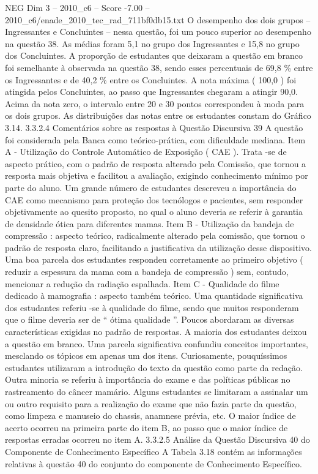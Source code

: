 \begin{textsample}{NEG Dim 3 – 2010\_c6 – Score -7.00 – 2010\_c6/enade\_2010\_tec\_rad\_711bf0db15.txt}
O desempenho dos dois grupos – Ingressantes e Concluintes – nessa questão, foi um pouco superior ao desempenho na questão 38.
As médias foram 5,1 no grupo dos Ingressantes e 15,8 no grupo dos Concluintes.
A proporção de estudantes que deixaram a questão em branco foi semelhante à observada na questão 38, sendo esses percentuais de 69,8 \% entre os Ingressantes e de 40,2 \% entre os Concluintes.
A nota máxima ( 100,0 ) foi atingida pelos Concluintes, ao passo que Ingressantes chegaram a atingir 90,0.
Acima da nota zero, o intervalo entre 20 e 30 pontos correspondeu à moda para os dois grupos.
As distribuições das notas entre os estudantes constam do Gráfico 3.14. 3.3.2.4 Comentários sobre as respostas à Questão Discursiva 39 A questão foi considerada pela Banca como teórico-prática, com dificuldade mediana.
Item A - Utilização do Controle Automático de Exposição ( CAE ).
Trata -se de aspecto prático, com o padrão de resposta alterado pela Comissão, que tornou a resposta mais objetiva e facilitou a avaliação, exigindo conhecimento mínimo por parte do aluno.
Um grande número de estudantes descreveu a importância do CAE como mecanismo para proteção dos tecnólogos e pacientes, sem responder objetivamente ao quesito proposto, no qual o aluno deveria se referir à garantia de densidade ótica para diferentes mamas.
Item B - Utilização da bandeja de compressão : aspecto teórico, radicalmente alterado pela comissão, que tornou o padrão de resposta claro, facilitando a justificativa da utilização desse dispositivo.
Uma boa parcela dos estudantes respondeu corretamente ao primeiro objetivo ( reduzir a espessura da mama com a bandeja de compressão ) sem, contudo, mencionar a redução da radiação espalhada.
Item C - Qualidade do filme dedicado à mamografia : aspecto também teórico.
Uma quantidade significativa dos estudantes referiu -se à qualidade do filme, sendo que muitos responderam que o filme deveria ser de “ ótima qualidade ”.
Poucos abordaram as diversas características exigidas no padrão de respostas.
A maioria dos estudantes deixou a questão em branco.
Uma parcela significativa confundiu conceitos importantes, mesclando os tópicos em apenas um dos itens.
Curiosamente, pouquíssimos estudantes utilizaram a introdução do texto da questão como parte da redação.
Outra minoria se referiu à importância do exame e das políticas públicas no rastreamento do câncer mamário.
Alguns estudantes se limitaram a assinalar um ou outro requisito para a realização do exame que não fazia parte da questão, como limpeza e manuseio do chassis, anamnese prévia, etc.
O maior índice de acerto ocorreu na primeira parte do item B, ao passo que o maior índice de respostas erradas ocorreu no item A. 3.3.2.5 Análise da Questão Discursiva 40 do Componente de Conhecimento Específico A Tabela 3.18 contém as informações relativas à questão 40 do conjunto do componente de Conhecimento Específico.

\end{textsample}
